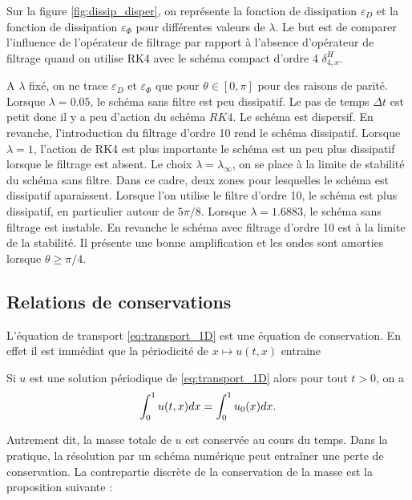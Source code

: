 Sur la figure \ref{fig:dissip_disper}, on représente la fonction de dissipation $\varepsilon_D$ et la fonction de dissipation $\varepsilon_{\Phi}$ pour différentes valeurs de $\lambda$. Le but est de comparer l'influence de l'opérateur de filtrage par rapport à l'absence d'opérateur de filtrage quand on utilise RK4 avec le schéma compact d'ordre 4 $\delta_{4,x}^H$.

A $\lambda$ fixé, on ne trace $\varepsilon_D$ et $\varepsilon_{\Phi}$ que pour $\theta \in [0, \pi]$ pour des raisons de parité. Lorsque $\lambda=0.05$, le schéma sans filtre est peu dissipatif. Le pas de temps $\Delta t$ est petit donc il y a peu d'action du schéma $RK4$. Le schéma est dispersif. En revanche, l'introduction du filtrage d'ordre 10 rend le schéma dissipatif. Lorsque $\lambda =1$, l'action de RK4 est plus importante le schéma est un peu plus dissipatif lorsque le filtrage est absent.
Le choix $\lambda = \lambda_{\infty}$, on se place à la limite de stabilité du schéma sans filtre. Dans ce cadre, deux zones pour lesquelles le schéma est dissipatif aparaissent. Lorsque l'on utilise le filtre d'ordre 10, le schéma est plus dissipatif, en particulier autour de $5 \pi/8$.
Lorsque $\lambda = 1.6883$, le schéma sans filtrage est instable. En revanche le schéma avec filtrage d'ordre 10 est à la limite de la stabilité. Il présente une bonne amplification et les ondes sont amorties lorsque $\theta \geq \pi/4$.







\subsection{Relations de conservations}

L'équation de transport \eqref{eq:transport_1D} est une équation de conservation. En effet il est immédiat que la périodicité de $x \mapsto u(t,x)$ entraine

\begin{proposition}
Si $u$ est une solution périodique de \eqref{eq:transport_1D} alors pour tout $t>0$, on a
\begin{equation}
\displaystyle\int_0^1 u(t,x)dx = \displaystyle\int_0^1 u_0(x)dx.
\end{equation}
\end{proposition}

Autrement dit, la masse totale de $u$ est conservée au cours du temps. Dans la pratique, la résolution par un schéma numérique peut entraîner une perte de conservation. 
La contrepartie discrète de la conservation de la masse est la proposition suivante :

